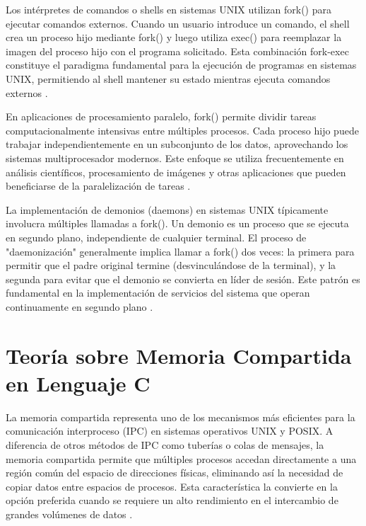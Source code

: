 {Los intérpretes de comandos o shells en sistemas UNIX utilizan fork() para ejecutar comandos externos. Cuando un usuario introduce un comando, el shell crea un proceso hijo mediante fork() y luego utiliza exec() para reemplazar la imagen del proceso hijo con el programa solicitado. Esta combinación fork-exec constituye el paradigma fundamental para la ejecución de programas en sistemas UNIX, permitiendo al shell mantener su estado mientras ejecuta comandos externos \cite{robbins2003unix}.
\vspace{10pt}

En aplicaciones de procesamiento paralelo, fork() permite dividir tareas computacionalmente intensivas entre múltiples procesos. Cada proceso hijo puede trabajar independientemente en un subconjunto de los datos, aprovechando los sistemas multiprocesador modernos. Este enfoque se utiliza frecuentemente en análisis científicos, procesamiento de imágenes y otras aplicaciones que pueden beneficiarse de la paralelización de tareas \cite{pacheco2011introduction}.
\vspace{10pt}

La implementación de demonios (daemons) en sistemas UNIX típicamente involucra múltiples llamadas a fork(). Un demonio es un proceso que se ejecuta en segundo plano, independiente de cualquier terminal. El proceso de "daemonización" generalmente implica llamar a fork() dos veces: la primera para permitir que el padre original termine (desvinculándose de la terminal), y la segunda para evitar que el demonio se convierta en líder de sesión. Este patrón es fundamental en la implementación de servicios del sistema que operan continuamente en segundo plano \cite{stevens2005unix}.

\section{Teoría sobre Memoria Compartida en Lenguaje C}

La memoria compartida representa uno de los mecanismos más eficientes para la comunicación interproceso (IPC) en sistemas operativos UNIX y POSIX. A diferencia de otros métodos de IPC como tuberías o colas de mensajes, la memoria compartida permite que múltiples procesos accedan directamente a una región común del espacio de direcciones físicas, eliminando así la necesidad de copiar datos entre espacios de procesos. Esta característica la convierte en la opción preferida cuando se requiere un alto rendimiento en el intercambio de grandes volúmenes de datos \cite{stevens2013advanced}.
\vspace{10pt}

}
